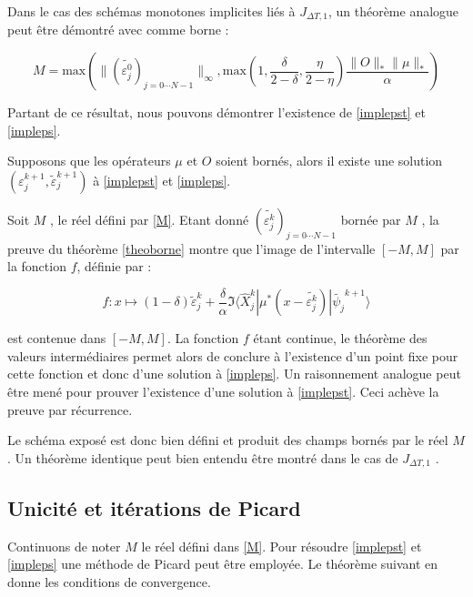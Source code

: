 Dans le cas des schémas monotones implicites liés à $J_{\Delta T,1}$, un théorème analogue peut être démontré avec comme borne :

$$  M = \text{max}(\lVert (\tilde{\varepsilon^0_j})_{j=0\cdots N-1}\lVert_{\infty}, \text{max}(1,\frac{\delta}{2-\delta}, \frac{\eta}{2-\eta})\frac{\lVert O \rVert_* \lVert \mu \rVert_* }{\alpha} ) $$

Partant de ce résultat, nous pouvons démontrer l’existence de \eqref{implepst} et \eqref{impleps}.

\begin{theorem}
	Supposons que les opérateurs $\mu$ et $O$ soient bornés, alors il existe une solution $ ( \varepsilon_j^{k+1}, \tilde{\varepsilon}_j^{k+1} ) $ à \eqref{implepst} et \eqref{impleps}.
\end{theorem}

\begin{ proof }
	
	Soit $M$ , le réel défini par \eqref{M}. Etant donné 
	$(\tilde{\varepsilon^k_j})_{j=0\cdots N-1}$ bornée par $M$ , la preuve du théorème \ref{theoborne} montre que l’image de l'intervalle $[-M, M ]$ par la fonction $f$, définie par :
	
	\begin{equation} \label{f}
	f: x \mapsto (1-\delta)\tilde{\varepsilon}_j^k + \frac{\delta}{\alpha} \Im \langle \hat{X}^k_j| \mu^* (x - \tilde{\varepsilon^k_j})| \tilde{\psi_j}^{k+1} \rangle
	\end{equation}
	
	est contenue dans $[-M, M ]$. La fonction $f$ étant continue, le théorème des valeurs intermédiaires permet alors de conclure à l'existence d’un point fixe pour cette fonction et donc d’une solution à \eqref{impleps}. Un raisonnement analogue peut être mené pour prouver l'existence d’une solution à \eqref{implepst}. Ceci achève la preuve par récurrence.
	
\end{ proof }

Le schéma exposé est donc bien défini et produit des champs bornés par le réel $M$ . Un théorème identique peut bien entendu être montré dans le cas de $ J_{\Delta T,1} $ .

\subsection{Unicité et itérations de Picard}
Continuons de noter $M$ le réel défini dans \eqref{M}. Pour résoudre \eqref{implepst} et \eqref{impleps} une méthode de Picard peut être employée. Le théorème suivant en donne les conditions de convergence.

